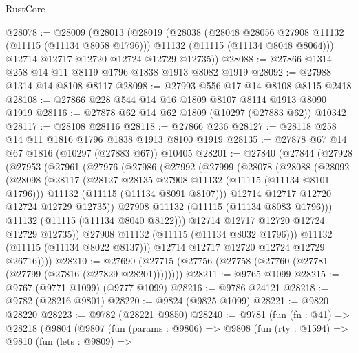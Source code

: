 \begin{lexlean}{RustCore}
\begin{coremodule}
@28078 := @28009
    (@28013
      (@28019
        (@28038
          (@28048 @28056 @27908 @11132 (@11115 (@11134 @8058 @1796)))
          @11132
          (@11115 (@11134 @8048 @8064)))
        @12714
        @12717
        @12720
        @12724
        @12729
        @12735))
@28088 := @27866 @1314 @258 @14 @11 @8119 @1796 @1838 @1913 @8082 @1919
@28092 := @27988 @1314 @14 @8108 @8117
@28098 := @27993 @556 @17 @14 @8108 @8115 @2418
@28108 := @27866 @228 @544 @14 @16 @1809 @8107 @8114 @1913 @8090 @1919
@28116 := @27878 @62 @14 @62 @1809 (@10297 (@27883 @62)) @10342
@28117 := @28108 @28116
@28118 := @27866 @236
@28127 := @28118 @258 @14 @11 @1816 @1796 @1838 @1913 @8100 @1919
@28135 := @27878 @67 @14 @67 @1816 (@10297 (@27883 @67)) @10405
@28201 := @27840
    (@27844
      (@27928
        (@27953
          (@27961
            (@27976
              (@27986
                (@27992
                  (@27999
                    (@28078
                      (@28088
                        (@28092
                          (@28098
                            (@28117
                              (@28127 @28135 @27908 @11132 (@11115 (@11134 @8101 @1796)))
                              @11132
                              (@11115 (@11134 @8091 @8107)))
                            @12714
                            @12717
                            @12720
                            @12724
                            @12729
                            @12735))
                        @27908
                        @11132
                        (@11115 (@11134 @8083 @1796)))
                      @11132
                      (@11115 (@11134 @8040 @8122)))
                    @12714
                    @12717
                    @12720
                    @12724
                    @12729
                    @12735))
                @27908
                @11132
                (@11115 (@11134 @8032 @1796)))
              @11132
              (@11115 (@11134 @8022 @8137)))
            @12714
            @12717
            @12720
            @12724
            @12729
            @26716))))
@28210 := @27690 (@27715 (@27756 (@27758 (@27760 (@27781 (@27799 (@27816 (@27829 @28201))))))))
@28211 := @9765 @1099
@28215 := @9767 (@9771 @1099) (@9777 @1099)
@28216 := @9786 @24121
@28218 := @9782 (@28216 @9801)
@28220 := @9824 (@9825 @1099)
@28221 := @9820 @28220
@28223 := @9782 (@28221 @9850)
@28240 := @9781
    (fun (fn : @41) =>
    @28218
      (@9804
        (@9807
          (fun (params : @9806) =>
          @9808
            (fun (rty : @1594) =>
            @9810
              (fun (lets : @9809) =>

\end{coremodule}
\end{lexlean}
